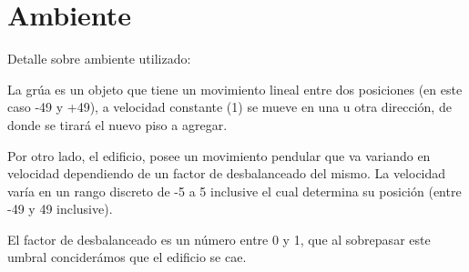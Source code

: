 \documentclass[11pt, a4paper]{article}
\begin{document}
	\maketitle

\section{Ambiente}
Detalle sobre ambiente utilizado:

La grúa es un objeto que tiene un movimiento lineal entre dos posiciones (en este caso -49 y +49), a velocidad constante (1) se mueve en una u otra dirección, de donde se tirará el nuevo piso a agregar. 

Por otro lado, el edificio, posee un movimiento pendular que va variando en velocidad dependiendo de un factor de desbalanceado del mismo. La velocidad varía en un rango discreto de -5 a 5 inclusive el cual determina su posición (entre -49 y 49 inclusive).

El factor de desbalanceado es un número entre 0 y 1, que al sobrepasar este umbral conciderámos que el edificio se cae. 
\end{document}
